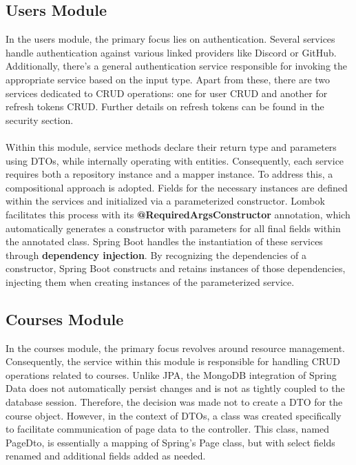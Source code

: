 \subsection{Users Module}

\noindent In the users module, the primary focus lies on authentication. Several services handle authentication against various linked providers like Discord or GitHub. Additionally, there's a general authentication service responsible for invoking the appropriate service based on the input type. Apart from these, there are two services dedicated to CRUD operations: one for user CRUD and another for refresh tokens CRUD. Further details on refresh tokens can be found in the security section.
\\\\
\noindent Within this module, service methods declare their return type and parameters using DTOs, while internally operating with entities. Consequently, each service requires both a repository instance and a mapper instance. To address this, a compositional approach is adopted. Fields for the necessary instances are defined within the services and initialized via a parameterized constructor. Lombok facilitates this process with its \textbf{@RequiredArgsConstructor} annotation, which automatically generates a constructor with parameters for all final fields within the annotated class. Spring Boot handles the instantiation of these services through \textbf{dependency injection}. By recognizing the dependencies of a constructor, Spring Boot constructs and retains instances of those dependencies, injecting them when creating instances of the parameterized service.

\subsection{Courses Module}

\noindent In the courses module, the primary focus revolves around resource management. Consequently, the service within this module is responsible for handling CRUD operations related to courses. Unlike JPA, the MongoDB integration of Spring Data does not automatically persist changes and is not as tightly coupled to the database session. Therefore, the decision was made not to create a DTO for the course object. However, in the context of DTOs, a class was created specifically to facilitate communication of page data to the controller. This class, named PageDto, is essentially a mapping of Spring's Page class, but with select fields renamed and additional fields added as needed.

